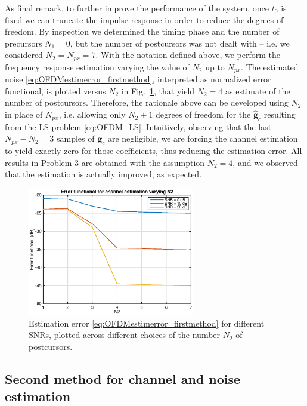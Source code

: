\documentclass[10pt]{article}
\begin{document}
As final remark, to further improve the performance of the system, once $t_0$ is fixed we can truncate the impulse response in order to reduce the degrees of freedom. By inspection we determined the timing phase and the number of precursors $N_1 \! = \! 0$, but the number of postcursors was not dealt with -- i.e. we considered $N_2 \! = \! N_{px} \! = \! 7$. With the notation defined above, we perform the frequency response estimation varying the value of $N_2$ up to $N_{px}$. The estimated noise \eqref{eq:OFDMestimerror_firstmethod}, interpreted as normalized error functional, is plotted versus $N_2$ in Fig.~\ref{fig:OFDM_chooseN2}, that yield $N_2 = 4$ as estimate of the number of postcursors. Therefore, the rationale above can be developed using $N_2$ in place of $N_{px}$, i.e. allowing only $N_2 + 1$ degrees of freedom for the $\mathbf{\hat{g}}_c$ resulting from the LS problem \eqref{eq:OFDM_LS}. Intuitively, observing that the last $N_{px} \! - \! N_2 \! = \! 3$ samples of $\mathbf{g}_c$ are negligible, we are forcing the channel estimation to yield exactly zero for those coefficients, thus reducing the estimation error. All results in Problem 3 are obtained with the assumption $N_2 = 4$, and we observed that the estimation is actually improved, as expected.

\begin{figure}
	\centering
	\includegraphics[width = 0.65\textwidth]{OFDM_chooseN2}
	\caption{Estimation error \eqref{eq:OFDMestimerror_firstmethod} for different SNRs, plotted across different choices of the number $N_2$ of postcursors.}
	\label{fig:OFDM_chooseN2}
\end{figure}


\subsection*{Second method for channel and noise estimation}
\end{document}
